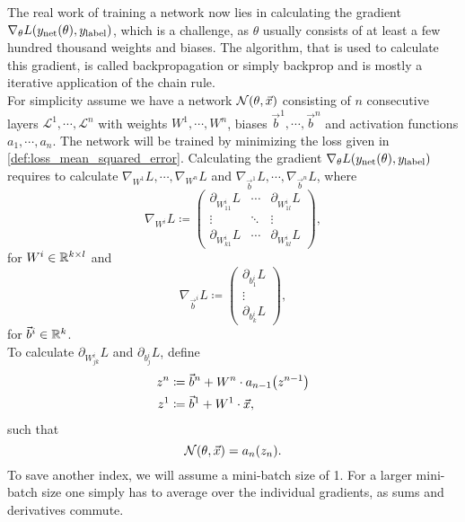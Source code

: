 The real work of training a network now lies in calculating the gradient $\nabla_\theta L{\left( y_\text{net}(\theta), y_\text{label} \right)}$, which is a challenge, as $\theta$ usually consists of at least a few hundred thousand weights and biases. The algorithm, that is used to calculate this gradient, is called backpropagation or simply backprop and is mostly a iterative application of the chain rule.\\
For simplicity assume we have a network $\mathcal{N}{\left( \theta, \vec{x} \right)}$ consisting of $n$ consecutive layers $\mathcal{L}^1,\cdots,\mathcal{L}^n$ with weights $W^1,\cdots,W^n$, biases $\vec{b}^1,\cdots,\vec{b}^n$ and activation functions $a_1,\cdots, a_n$. The network will be trained by minimizing the loss given in \eqref{def:loss_mean_squared_error}. Calculating the gradient $\nabla_\theta L{\left( y_\text{net}(\theta), y_\text{label} \right)}$ requires to calculate $\nabla_{W^1}L, \cdots,\nabla_{W^n}L$ and $\nabla_{\vec{b}^1}L,\cdots,\nabla_{\vec{b}^n}L$, where
\begin{equation}\label{def:matrix_gradient}
\nabla_{W^i}L\coloneqq
\begin{pmatrix}
	\partial_{W^i_{11}}L & \cdots & \partial_{W^i_{1l}}L\\
	\vdots & \ddots & \vdots\\
	\partial_{W^i_{k1}}L & \cdots & \partial_{W^i_{kl}}L
\end{pmatrix},
\end{equation}
for $W^i\in \mathbb{R}^{k\times l}$ and
\begin{equation}\label{def:vector_gradient}
\nabla_{\vec{b}^i}L\coloneqq
\begin{pmatrix}
	\partial_{b^i_1}L\\
	\vdots\\
	\partial_{b^i_k}L
\end{pmatrix},
\end{equation}
for $\vec{b}^i\in\mathbb{R}^k$.\\
To calculate $\partial_{W^i_{jk}}L$ and $\partial_{b^i_j}L$, define
\begin{align}\label{def:backprop_z}
z^n & \coloneqq\vec{b}^n+W^n\cdot a_{n-1}{\left( z^{n-1} \right)}\nonumber\\
z^1 & \coloneqq\vec{b}^1+W^1\cdot\vec{x},
\end{align}
such that
\begin{equation}
\mathcal{N}{\left( \theta,\vec{x} \right)}=a_n{\left( z_n \right)}.
\end{equation}
To save another index, we will assume a mini-batch size of 1. For a larger mini-batch size one simply has to average over the individual gradients, as sums and derivatives commute.\\
